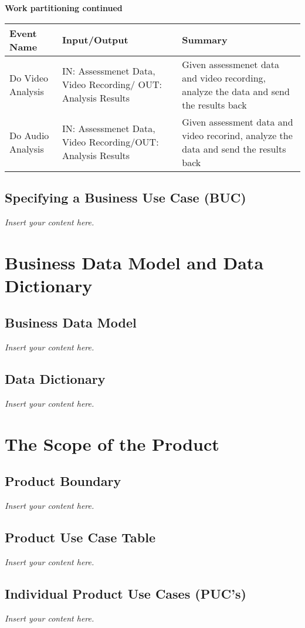 \documentclass[12pt]{article}
\newcommand{\lips}{\textit{Insert your content here.}}
\begin{document}
\newpage
\noindent \textbf{Work partitioning continued}
\begin{table}[H]
  \centering
  \begin{tabularx}{1.2\textwidth} { 
     >{\raggedright\arraybackslash}X 
    | >{\raggedright\arraybackslash}X 
    | >{\raggedright\arraybackslash}X  }
  \toprule
  \textbf{Event Name} & \textbf{Input/Output} & \textbf{Summary} \\
  \midrule
  Do Video Analysis & IN: Assessmenet Data, Video Recording/ OUT: Analysis Results  & Given assessmenet data and video recording, analyze the data and send the results back\\
  \midrule
  Do Audio Analysis & IN: Assessmenet Data, Video Recording/OUT: Analysis Results & Given assessment data and video recorind, analyze the data and send the results back \\
\bottomrule
\end{tabularx}
\end{table}
\subsection{Specifying a Business Use Case (BUC)}
\lips

\section{Business Data Model and Data Dictionary}
\subsection{Business Data Model}
\lips
\subsection{Data Dictionary}
\lips

\section{The Scope of the Product}
\subsection{Product Boundary}
\lips
\subsection{Product Use Case Table}
\lips
\subsection{Individual Product Use Cases (PUC's)}
\lips
\end{document}
